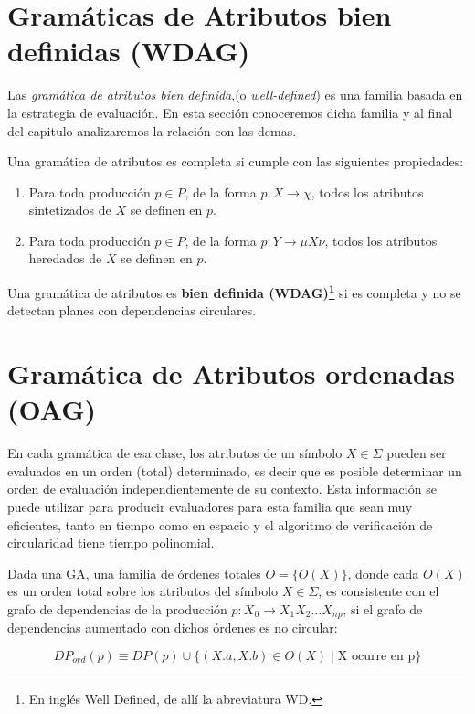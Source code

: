 \section{Gramáticas de Atributos bien definidas (WDAG)}
\label{sec:well-defined}

Las \textit{gramática de atributos bien definida},(o \textit{well-defined}) es una familia basada en la estrategia de evaluación. En esta sección conoceremos dicha familia y al final del capitulo analizaremos la relación con las demas. 

\begin{definition} \label{def:gacompleta}Una gramática de atributos es completa si cumple con las siguientes propiedades:
\begin{enumerate}
\item Para toda producción $p \in P$, de la forma $p:X \rightarrow \chi$, todos los atributos sintetizados de $X$ se definen en $p$.
\item Para toda producción $p \in P$, de la forma $p:Y \rightarrow \mu X \nu$, todos los atributos heredados de $X$ se definen en $p$.
\end{enumerate}
\end{definition}

\begin{definition} 
Una gramática de atributos es \textbf{bien definida (WDAG)\footnote{En inglés Well Defined, de allí la abreviatura WD.}} si es completa y no se detectan planes con dependencias circulares.
\end{definition}

\section{Gramática de Atributos ordenadas (OAG)}
\label{sec:def-oag}
En cada gramática de esa clase, los atributos de un símbolo $X \in \Sigma$ pueden ser evaluados en un orden (total) determinado, es decir que es posible determinar un orden de evaluación independientemente de su contexto.
Esta información se puede utilizar para producir evaluadores para esta familia que sean muy eficientes, tanto en tiempo como en espacio y el algoritmo de verificación de circularidad tiene tiempo polinomial.

\begin{definition} Dada una GA, una familia de órdenes totales $O=\{O(X)\}$, donde cada $ O(X) $ es un orden total sobre los atributos del símbolo $ X \in \Sigma $, es consistente con el grafo de dependencias de la producción $p: X_0 \rightarrow X_1 X_2 \ldots X_{np}$, si el grafo de dependencias aumentado con dichos órdenes es no circular:

$$ DP_{ord}(p) \equiv DP(p) \cup \{ (X.a, X.b) \in O(X) \mid \textrm{X ocurre en p} \} $$
\end{definition}

